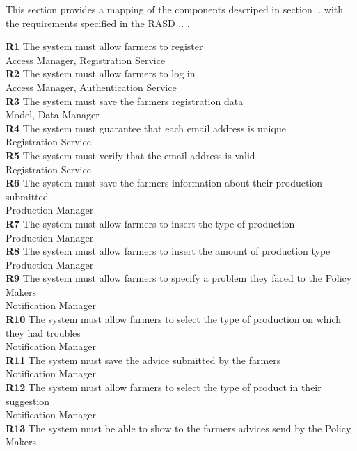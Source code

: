 This section provides a mapping of the components descriped in section .. with the requirements specified in the RASD .. .

\textbf{R1} The system must allow farmers to register\\
\indent Access Manager, Registration Service\\
\textbf{R2} The system must allow farmers to log in\\
\indent Access Manager, Authentication Service\\
\textbf{R3} The system must save the farmers registration data\\
\indent Model, Data Manager\\
\textbf{R4} The system must guarantee that each email address is unique\\
\indent Registration Service\\
\textbf{R5} The system must verify that the email address is valid\\
\indent Registration Service\\
\textbf{R6} The system must save the farmers information about their production submitted\\
\indent Production Manager\\
\textbf{R7} The system must allow farmers to insert the type of production \\
\indent Production Manager\\
\textbf{R8} The system must allow farmers to insert the amount of production type\\
\indent Production Manager\\
\textbf{R9} The system must allow farmers to specify a problem they faced to the Policy Makers\\
\indent Notification Manager\\
\textbf{R10} The system must allow farmers to select the type of production on which they had troubles\\
\indent Notification Manager\\
\textbf{R11} The system must save the advice submitted by the farmers\\
\indent Notification Manager\\
\textbf{R12} The system must allow farmers to select the type of product in their suggestion\\
\indent Notification Manager\\
\textbf{R13} The system must be able to show to the farmers advices send by the Policy Makers\\
